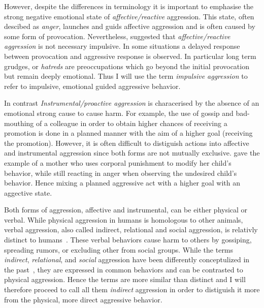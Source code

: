 However, despite the differences in terminology it is important to emphasise the strong negative emotional state of \textit{affective/reactive} aggression.
This state, often descibed as \textit{anger}, launches and guids affective aggression  and is often caused by some form of provocation\cite{Geen2001}.
Nevertheless, \citet{Frijda1994} suggested that \textit{affective/reactive aggression} is not necessary impulsive.
In some situations a delayed response between provocation and aggressive response is observed. 
In particular long term grudges, or \textit{hatreds} are preoccupations which go beyond the initial provocation but remain deeply emotional.
Thus I will use the term \textit{impulsive aggression} to refer to impulsive, emotional guided aggressive behavior.

In contrast \textit{Instrumental/proactive aggression} is characerised by the absence of an emotional strong cause to cause harm.
For example, the use of gossip and bad-mouthing of a colleague in order to obtain higher chances of receiving a promotion is done in a planned manner with the aim of a higher goal (receiving the promotion).
However, it is often difficult to distiguish actions into affective and instrumental aggression since both forms are not mutually exclusive.
\citet{Geen2001} gave the example of a mother who uses corporal punishment to modify her child's behavior, while still reacting in anger when observing the undesired child's behavior.
Hence mixing a planned aggressive act with a higher goal with an aggective state.

Both forms of aggression, affective and instrumental, can be either physical or verbal.
While physical aggression in humans is homologous to other animals, verbal aggression, also called indirect, relational and social aggression, is relativly distinct to humans~\cite{Archer2005}.
These verbal behaviors cause harm to others by gossiping, spreading rumors, or excluding other from social groups.
While the terms \textit{indirect}, \textit{relational}, and \textit{social} aggression have been differently conceptulized in the past~\cite{Archer2001}, they are expressed in common behaviors and can be contrasted to physical aggression.
Hence the terms are more similar than distinct and I will therefore proceed to call all them \textit{indirect} aggression in order to distiguish it more from the physical, more direct aggressive behavior\cite{Archer2005}.

